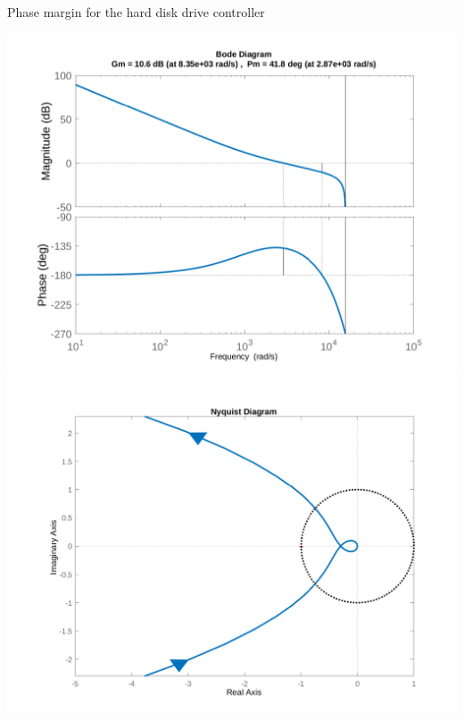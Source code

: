 \documentclass[presentation,aspectratio=169]{beamer}
\begin{document}
\begin{frame}[label={sec:orgc145c3c}]{Phase margin for the hard disk drive controller}
\begin{center}
  \includegraphics[height=0.5\textheight]{../../matlab/harddisk_margin_crop}
  \includegraphics[height=0.5\textheight]{../../matlab/harddisk_nyquist_crop}

\end{center}
\end{frame}
\end{document}
